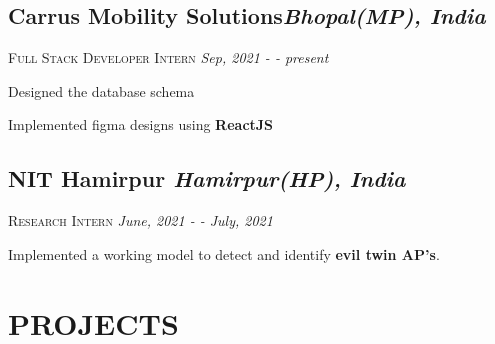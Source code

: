 \documentclass[12pt]{article}
\begin{document}
\subsection*{Carrus Mobility Solutions\hfill \normalsize \normalfont \textit{Bhopal(MP), India}}
\vspace{-1ex}
\textsc{\textmd{Full Stack Developer Intern}} \hfill \normalsize \textit{Sep, 2021 - - present}
\vspace{-1ex}

\begin{description}
\setlength{\itemindent}{2\parindent}
\setlength{\itemsep}{0em}
\item[$\bullet$]{Designed the database schema}
\item[$\bullet$]{Implemented figma designs using \textbf{ReactJS}}
\end{description}

\subsection*{NIT Hamirpur \hfill \normalsize \normalfont \textit{Hamirpur(HP), India}}
\vspace{-1ex}
\textsc{\textmd{Research Intern}} \hfill \normalsize \textit{June, 2021 - - July, 2021}
\vspace{-1ex}

\begin{description}
\setlength{\itemindent}{2\parindent}
\setlength{\itemsep}{0em}
\item[$\bullet$]{Implemented a working model to detect and identify \textbf{evil twin AP's}.}
\end{description}


\section{PROJECTS}

\end{document}
